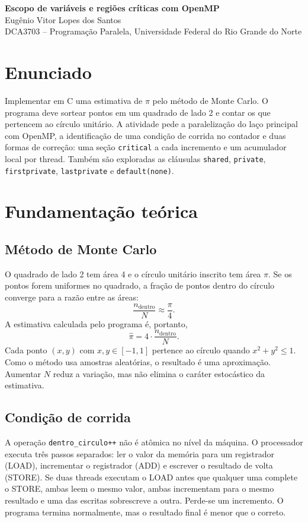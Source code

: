 \documentclass[11pt,letterpaper]{article}
\begin{document}
\pagestyle{plain}

\begin{center}
    {\LARGE\bfseries Escopo de variáveis e regiões críticas com OpenMP}\\[0.4em]
    {\normalsize Eugênio Vitor Lopes dos Santos}\\[0.3em]
    {\small DCA3703 -- Programação Paralela, Universidade Federal do Rio Grande do Norte}\\[0.3em]
\end{center}

\section{Enunciado}
Implementar em C uma estimativa de $\pi$ pelo método de Monte Carlo. O programa deve sortear pontos em um quadrado de lado 2 e contar os que pertencem ao círculo unitário. A atividade pede a paralelização do laço principal com OpenMP, a identificação de uma condição de corrida no contador e duas formas de correção: uma seção \texttt{critical} a cada incremento e um acumulador local por thread. Também são exploradas as cláusulas \texttt{shared}, \texttt{private}, \texttt{firstprivate}, \texttt{lastprivate} e \texttt{default(none)}.

\section{Fundamentação teórica}

\subsection{Método de Monte Carlo}
O quadrado de lado 2 tem área 4 e o círculo unitário inscrito tem área $\pi$. Se os pontos forem uniformes no quadrado, a fração de pontos dentro do círculo converge para a razão entre as áreas:
\[
\frac{n_{\text{dentro}}}{N} \approx \frac{\pi}{4}.
\]
A estimativa calculada pelo programa é, portanto,
\[
\hat{\pi} = 4 \cdot \frac{n_{\text{dentro}}}{N}.
\]
Cada ponto $(x,y)$ com $x,y \in [-1,1]$ pertence ao círculo quando $x^2 + y^2 \leq 1$. Como o método usa amostras aleatórias, o resultado é uma aproximação. Aumentar $N$ reduz a variação, mas não elimina o caráter estocástico da estimativa.

\subsection{Condição de corrida}
A operação \texttt{dentro\_circulo++} não é atômica no nível da máquina. O processador executa três passos separados: ler o valor da memória para um registrador (LOAD), incrementar o registrador (ADD) e escrever o resultado de volta (STORE). Se duas threads executam o LOAD antes que qualquer uma complete o STORE, ambas leem o mesmo valor, ambas incrementam para o mesmo resultado e uma das escritas sobrescreve a outra. Perde-se um incremento. O programa termina normalmente, mas o resultado final é menor que o correto.
\end{document}

